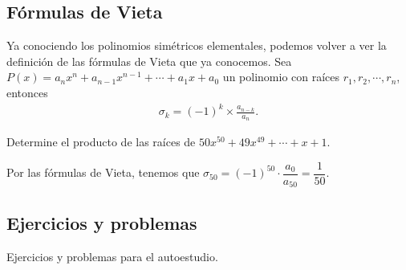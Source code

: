 \subsection{Fórmulas de Vieta}

Ya conociendo los polinomios simétricos elementales, podemos volver a ver la definición de las fórmulas de Vieta que ya conocemos.
Sea $P(x) = a_n x^n + a_{n - 1} x^{n - 1} + \cdots  + a_1 x + a_0$ un polinomio con raíces $r_1, r_2, \cdots, r_n$,
entonces
\begin{gather*}
    \sigma_k = (-1)^k\times \frac{a_{n - k}}{a_n}.
\end{gather*}

\begin{example}
    Determine el producto de las raíces de $50x^{50} + 49x^{49} + \cdots + x + 1.$
\end{example}
\begin{solution}
    Por las fórmulas de Vieta, tenemos que $\sigma_{50} = (-1)^{50} \cdot \dfrac{a_0}{a_{50}} = \dfrac{1}{50}.$
\end{solution}



\subsection{Ejercicios y problemas}

Ejercicios y problemas para el autoestudio.

